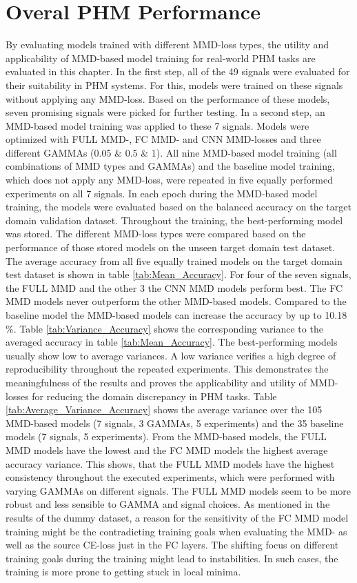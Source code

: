 \section{Overal PHM Performance}\label{ch:PHM_performance}
By evaluating models trained with different MMD-loss types, the utility and applicability of MMD-based model training for real-world PHM tasks are evaluated in this chapter. In the first step, all of the 49 signals were evaluated for their suitability in PHM systems. For this, models were trained on these signals without applying any MMD-loss. Based on the performance of these models, seven promising signals were picked for further testing. In a second step, an MMD-based model training was applied to these 7 signals. Models were optimized with FULL MMD-, FC MMD- and CNN MMD-losses and three different GAMMAs (0.05 $\&$ 0.5 $\&$ 1). All nine MMD-based model training (all combinations of MMD types and GAMMAs) and the baseline model training, which does not apply any MMD-loss, were repeated in five equally performed experiments on all 7 signals. In each epoch during the MMD-based model training, the models were evaluated based on the balanced accuracy on the target domain validation dataset. Throughout the training, the best-performing model was stored. The different MMD-loss types were compared based on the performance of those stored models on the unseen target domain test dataset. The average accuracy from all five equally trained models on the target domain test dataset is shown in table \ref{tab:Mean_Accuracy}. For four of the seven signals, the FULL MMD and the other 3 the CNN MMD models perform best. The FC MMD models never outperform the other MMD-based models. Compared to the baseline model the MMD-based models can increase the accuracy by up to 10.18$\%$. Table \ref{tab:Variance_Accuracy} shows the corresponding variance to the averaged accuracy in table \ref{tab:Mean_Accuracy}. The best-performing models usually show low to average variances. A low variance verifies a high degree of reproducibility throughout the repeated experiments. This demonstrates the meaningfulness of the results and proves the applicability and utility of MMD-losses for reducing the domain discrepancy in PHM tasks. Table \ref{tab:Average_Variance_Accuracy} shows the average variance over the 105 MMD-based models (7 signals, 3 GAMMAs, 5 experiments) and the 35 baseline models (7 signals, 5 experiments). From the MMD-based models, the FULL MMD models have the lowest and the FC MMD models the highest average accuracy variance. This shows, that the FULL MMD models have the highest consistency throughout the executed experiments, which were performed with varying GAMMAs on different signals. The FULL MMD models seem to be more robust and less sensible to GAMMA and signal choices. As mentioned in the results of the dummy dataset, a reason for the sensitivity of the FC MMD model training might be the contradicting training goals when evaluating the MMD- as well as the source CE-loss just in the FC layers. The shifting focus on different training goals during the training might lead to instabilities. In such cases, the training is more prone to getting stuck in local minima.
